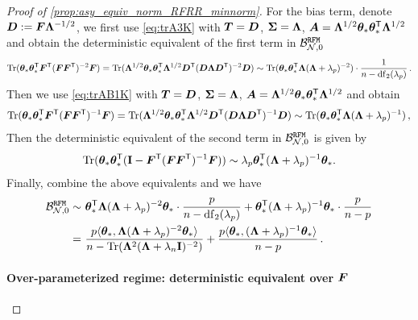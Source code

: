 \begin{proof}[Proof of \cref{prop:asy_equiv_norm_RFRR_minnorm}]
For the bias term, denote $\bD:=\bF\bLambda^{-1/2}$, we first use \cref{eq:trA3K} with $\bT=\bD$, $\bSigma=\bLambda$, $\bA=\bLambda^{1/2} \btheta_* \btheta_*^\sT \bLambda^{1/2}$ and obtain the deterministic equivalent of the first term in $
\mathcal{B}_{\mathcal{N},0}^{\tt RFM}$
\[
\begin{aligned}
\Tr(\btheta_* \btheta_*^\sT \bF^\sT ( \bF \bF^\sT )^{-2} \bF) = \Tr( \bLambda^{1/2} \btheta_* \btheta_*^\sT \bLambda^{1/2} \bD^\sT ( \bD \bLambda \bD^\sT )^{-2} \bD) \sim \Tr( \btheta_* \btheta_*^\sT \bLambda ( \bLambda + \lambda_p )^{-2} ) \cdot \frac{1}{n-{\rm df}_2(\lambda_p)}\,.
\end{aligned}
\]
Then we use \cref{eq:trAB1K} with $\bT=\bD$, $\bSigma=\bLambda$, $\bA=\bLambda^{1/2} \btheta_* \btheta_*^\sT \bLambda^{1/2}$ and obtain 
\[
\begin{aligned}
\Tr(\btheta_* \btheta_*^\sT \bF^\sT (\bF \bF^\sT)^{-1} \bF) = \Tr( \bLambda^{1/2} \btheta_* \btheta_*^\sT \bLambda^{1/2} \bD^\sT ( \bD \bLambda \bD^\sT )^{-1} \bD) \sim \Tr(\btheta_* \btheta_*^\sT \bLambda (\bLambda +\lambda_p)^{-1})\,,
\end{aligned}
\]
Then the deterministic equivalent of the second term in $\mathcal{B}_{\mathcal{N},0}^{\tt RFM} $ is given by
\[
\begin{aligned}
\Tr(\btheta_* \btheta_*^\sT ( \id - \bF^\sT (\bF\bF^\sT)^{-1} \bF )) \sim \lambda_p \btheta_*^\sT (\bLambda +\lambda_p)^{-1} \btheta_*.
\end{aligned}
\]
Finally, combine the above equivalents and we have
\[
\begin{aligned}
\mathcal{B}_{\mathcal{N},0}^{\tt RFM} \sim&~ \btheta_*^\sT \bLambda (\bLambda +\lambda_p)^{-2} \btheta_* \cdot \frac{p}{n-{\rm df}_2(\lambda_p)} + \btheta_*^\sT (\bLambda +\lambda_p)^{-1} \btheta_* \cdot \frac{p}{n-p}\\
=&~ \frac{p\<\btheta_*, \bLambda (\bLambda +\lambda_p)^{-2} \btheta_*\>}{n-\Tr(\bLambda^2(\bLambda+\lambda_n\id)^{-2})} + \frac{p\<\btheta_*, (\bLambda +\lambda_p)^{-1} \btheta_*\>}{n-p}\,.
\end{aligned}
\]
\paragraph{Over-parameterized regime: deterministic equivalent over $\bF$}


\end{proof}
